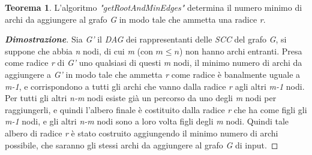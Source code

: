 \documentclass[10pt,a4paper,oneside,article,italian]{memoir}
\theoremstyle{definition}
\newtheorem{teorema}{Teorema}
\begin{document}
\begin{teorema}
L'algoritmo \textit{"getRootAndMinEdges"} determina il numero minimo di archi da aggiungere al grafo \textit{G} in modo tale che ammetta una radice \textit{r}.
\end{teorema}
\begin{proof}[\textbf{Dimostrazione}]
Sia \textit{G'} il \textit{DAG} dei rappresentanti delle \textit{SCC} del grafo \textit{G}, si suppone che abbia \textit{n} nodi, di cui \textit{m} (con \textit{$m \le n$}) non hanno archi entranti. Presa come radice \textit{r} di \textit{G'} uno qualsiasi di questi \textit{m} nodi, il minimo numero di archi da aggiungere a \textit{G'} in modo tale che ammetta \textit{r} come radice è banalmente uguale a \textit{m-1}, e corrispondono a tutti gli archi che vanno dalla radice \textit{r} agli altri \textit{m-1} nodi. Per tutti gli altri \textit{n-m} nodi esiste già un percorso da uno degli \textit{m} nodi per raggiungerli, e quindi l'albero finale è costituito dalla radice \textit{r} che ha come figli gli \textit{m-1} nodi, e gli altri \textit{n-m} nodi sono a loro volta figli degli \textit{m} nodi. Quindi tale albero di radice \textit{r} è stato costruito aggiungendo il minimo numero di archi possibile, che saranno gli stessi archi da aggiungere al grafo \textit{G} di input.
\end{proof}
\end{document}
